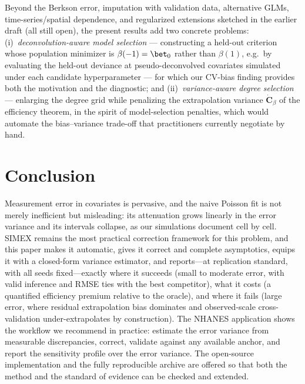 Beyond the Berkson error, imputation with validation data,
alternative GLMs, time-series/spatial dependence, and regularized
extensions sketched in the earlier draft (all still open), the present
results add two concrete problems: (i)~\emph{deconvolution-aware model
selection} --- constructing a held-out criterion whose population
minimizer is $\beta(-1)=\bet_0$ rather than $\beta(1)$, e.g.\ by
evaluating the held-out deviance at pseudo-deconvolved covariates
simulated under each candidate hyperparameter --- for which our
CV-bias finding provides both the motivation and the diagnostic; and
(ii)~\emph{variance-aware degree selection} --- enlarging the degree
grid while penalizing the extrapolation variance
$\dot{\bm C}_\beta$ of the efficiency theorem, in the spirit of
model-selection penalties, which would automate the bias--variance
trade-off that practitioners currently negotiate by hand.

\section{Conclusion}\label{sec:conclusion}

Measurement error in covariates is pervasive, and the naive Poisson
fit is not merely inefficient but misleading: its attenuation grows
linearly in the error variance and its intervals collapse, as our
simulations document cell by cell. SIMEX remains the most practical
correction framework for this problem, and this paper makes it
automatic, gives it correct and complete asymptotics, equips it with a
closed-form variance estimator, and reports---at replication
standard, with all seeds fixed---exactly where it succeeds (small to
moderate error, with valid inference and RMSE ties with the best
competitor), what it costs (a quantified efficiency premium relative
to the oracle), and where it fails (large error, where residual
extrapolation bias dominates and observed-scale cross-validation
under-extrapolates by construction). The NHANES application shows the
workflow we recommend in practice: estimate the error variance from
measurable discrepancies, correct, validate against any available
anchor, and report the sensitivity profile over the error variance.
The open-source implementation and the fully reproducible archive are
offered so that both the method and the standard of evidence can be
checked and extended.

